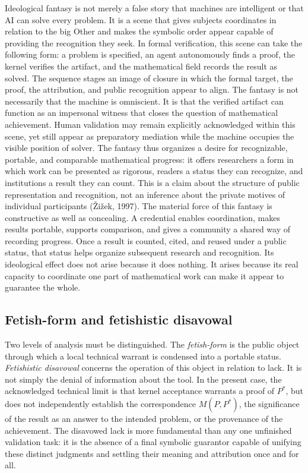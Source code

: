 \documentclass[pdflatex,sn-apa]{sn-jnl}
\begin{document}
Ideological fantasy is not merely a false story that machines are intelligent or that AI can solve every problem. It is a scene that gives subjects coordinates in relation to the big Other and makes the symbolic order appear capable of providing the recognition they seek. In formal verification, this scene can take the following form: a problem is specified, an agent autonomously finds a proof, the kernel verifies the artifact, and the mathematical field records the result as solved. The sequence stages an image of closure in which the formal target, the proof, the attribution, and public recognition appear to align. The fantasy is not necessarily that the machine is omniscient. It is that the verified artifact can function as an impersonal witness that closes the question of mathematical achievement. Human validation may remain explicitly acknowledged within this scene, yet still appear as preparatory mediation while the machine occupies the visible position of solver. The fantasy thus organizes a desire for recognizable, portable, and comparable mathematical progress: it offers researchers a form in which work can be presented as rigorous, readers a status they can recognize, and institutions a result they can count. This is a claim about the structure of public representation and recognition, not an inference about the private motives of individual participants (Žižek, 1997).
The material force of this fantasy is constructive as well as concealing. A credential enables coordination, makes results portable, supports comparison, and gives a community a shared way of recording progress. Once a result is counted, cited, and reused under a public status, that status helps organize subsequent research and recognition. Its ideological effect does not arise because it does nothing. It arises because its real capacity to coordinate one part of mathematical work can make it appear to guarantee the whole.

\subsection{Fetish-form and fetishistic disavowal}

Two levels of analysis must be distinguished. The \emph{fetish-form} is the public object through which a local technical warrant is condensed into a portable status. \emph{Fetishistic disavowal} concerns the operation of this object in relation to lack. It is not simply the denial of information about the tool. In the present case, the acknowledged technical limit is that kernel acceptance warrants a proof of \(P^*\), but does not independently establish the correspondence \(M(P,P^*)\), the significance of the result as an answer to the intended problem, or the provenance of the achievement. The disavowed lack is more fundamental than any one unfinished validation task: it is the absence of a final symbolic guarantor capable of unifying these distinct judgments and settling their meaning and attribution once and for all.
\end{document}
